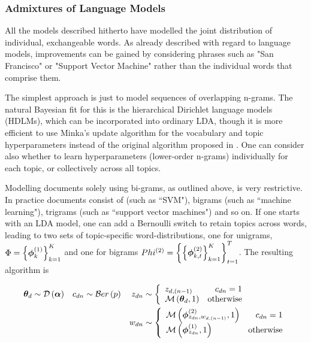 \subsubsection*{Admixtures of Language Models}
All the models described hitherto have modelled the joint distribution of individual, exchangeable words. As already described with regard to language models, improvements can be gained by considering phrases such as "San Francisco" or "Support Vector Machine" rather than the individual words that comprise them.

The simplest approach is just to model sequences of overlapping n-grams. The natural Bayesian fit for this is the hierarchical Dirichlet language models (HDLMs), which can be incorporated into ordinary LDA\cite{Wallach2006}, though it is more efficient to use  Minka's update algorithm\cite{Minka2002} for the vocabulary and topic hyperparameters instead of the original algorithm proposed in \cite{MacKay1995}. One can consider also whether to learn hyperparameters (lower-order n-grams) individually for each topic, or collectively across all topics. 

Modelling documents solely using bi-grams, as outlined above, is very restrictive. In practice documents consist of (such as ``SVM"), bigrams (such as ``machine learning"), trigrams (such as ``support vector machines") and so on. If one starts with an LDA model, one can add a Bernoulli switch to retain topics across words, leading to two sets of topic-specific word-distributions, one for unigrams, $\Phi = \left\{ \bm \phi_k^{(1)} \right\}_{k=1}^K$ and one for bigrams $Phi^{(2)} = \left\{\left\{ \bm \phi_{k,t}^{(2)} \right\}_{k=1}^K\right\}_{t=1}^T$. The resulting algorithm is\cite{Wang2007}

\begin{align*}
{  \bm \theta _d } & \sim \mathcal{D} \left( {\bm \alpha} \right) &
c_{dn} & \sim \mathcal{B}er \left( p \right) &
z_{dn} & \sim \left\{
    \begin{array}{lr}
        z_{d,(n-1)} & c_{dn} = 1 \\
        \mathcal{M} \left( {{ \bm \theta_d }},{1} \right) & \text{otherwise}
    \end{array}
\right. \\
& &
& &
w_{dn} & \sim \left\{
    \begin{array}{lr}
        \mathcal{M} \left( {\bm \phi_{z_{dn},w_{d,(n-1)}}^{(2)}},{1} \right) & c_{dn} = 1 \\
        \mathcal{M} \left( {\bm \phi_{z_{dn}}^{(1)}},{1} \right) & \text{otherwise}
    \end{array}
\right.
\end{align*}

